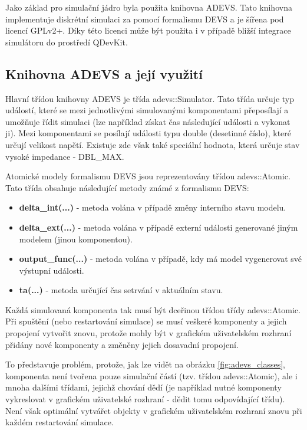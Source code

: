 Jako základ pro simulační jádro byla použita knihovna ADEVS. Tato knihovna implementuje diskrétní simulaci za pomocí formalismu DEVS a je šířena pod licencí GPLv2+. Díky této licenci může být použita i v případě bližší integrace simulátoru do prostředí QDevKit.

\subsection{Knihovna ADEVS a její využití}

Hlavní třídou knihovny ADEVS je třída adevs::Simulator. Tato třída určuje typ událostí, které se mezi jednotlivými simulovanými komponentami přeposílají a umožňuje řídit simulaci (lze například získat čas následující události a vykonat ji). Mezi komponentami se posílají události typu double (desetinné číslo),  které určují velikost napětí. Existuje zde však také speciální hodnota, která určuje stav vysoké impedance - DBL\_MAX.

Atomické modely formalismu DEVS jsou reprezentovány třídou adevs::Atomic. Tato třída obsahuje následující metody známé z formalismu DEVS:

\begin{itemize}
\item \textbf{delta\_int(...)} - metoda volána v případě změny interního stavu modelu.
\item \textbf{delta\_ext(...)} - metoda volána v případě externí události generované jiným modelem (jinou komponentou).
\item \textbf{output\_func(...)} - metoda volána v případě, kdy má model vygenerovat své výstupní události.
\item \textbf{ta(...)} - metoda určující čas setrvání v aktuálním stavu.
\end{itemize}

Každá simulovaná komponenta tak musí být dceřinou třídou třídy adevs::Atomic. Při spuštění (nebo restartování simulace) se musí veškeré komponenty a jejich propojení vytvořit znovu, protože mohly být v grafickém uživatelském rozhraní přidány nové komponenty a změněny jejich dosavadní propojení.

To představuje problém, protože, jak lze vidět na obrázku \ref{fig:adevs_classes}, komponenta není tvořena pouze simulační částí (tzv. třídou adevs::Atomic), ale i mnoha dalšími třídami, jejichž chování dědí (je například nutné komponenty vykreslovat v grafickém uživatelské rozhraní - dědit tomu odpovídající třídu). Není však optimální vytvářet objekty v grafickém uživatelském rozhraní znovu při každém restartování simulace.


